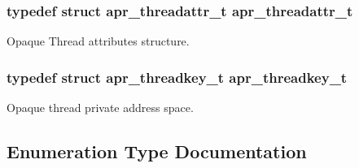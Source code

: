 \subsubsection[{\texorpdfstring{apr\+\_\+threadattr\+\_\+t}{apr_threadattr_t}}]{\setlength{\rightskip}{0pt plus 5cm}typedef struct {\bf apr\+\_\+threadattr\+\_\+t} {\bf apr\+\_\+threadattr\+\_\+t}}\hypertarget{group__apr__thread__proc_ga35de571e9944871c10b38d8feef885ac}{}\label{group__apr__thread__proc_ga35de571e9944871c10b38d8feef885ac}
Opaque Thread attributes structure. 
\subsubsection[{\texorpdfstring{apr\+\_\+threadkey\+\_\+t}{apr_threadkey_t}}]{\setlength{\rightskip}{0pt plus 5cm}typedef struct {\bf apr\+\_\+threadkey\+\_\+t} {\bf apr\+\_\+threadkey\+\_\+t}}\hypertarget{group__apr__thread__proc_ga337c9c1bd2d47740022071a5c41f2edb}{}\label{group__apr__thread__proc_ga337c9c1bd2d47740022071a5c41f2edb}
Opaque thread private address space. 

\subsection{Enumeration Type Documentation}
